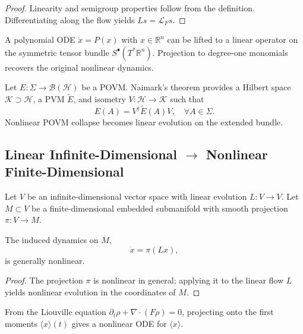 \begin{proof}
Linearity and semigroup properties follow from the definition. Differentiating
    along the flow yields $L s = \mathcal{L}_F s$.
\end{proof}

\begin{example}
A polynomial ODE $\dot{x} = P(x)$ with $x \in \mathbb{R}^n$ can be lifted to a
    linear operator on the symmetric tensor bundle
    $S^\bullet(T^*\mathbb{R}^n)$. Projection to degree-one monomials recovers
    the original nonlinear dynamics.
\end{example}

\begin{example}
Let $E: \Sigma \to \mathcal{B}(\mathcal{H})$ be a POVM. Naimark's theorem
    provides a Hilbert space $\mathcal{K} \supset \mathcal{H}$, a PVM
    $\tilde{E}$, and isometry $V: \mathcal{H} \to \mathcal{K}$ such that
\[
E(A) = V^\dagger \tilde{E}(A) V, \quad \forall A \in \Sigma.
\]
Nonlinear POVM collapse becomes linear evolution on the extended bundle.
\end{example}

\subsection{Linear Infinite-Dimensional $\to$ Nonlinear Finite-Dimensional}

Let $V$ be an infinite-dimensional vector space with linear evolution $L: V \to
V$. Let $M \subset V$ be a finite-dimensional embedded submanifold with smooth
projection $\pi: V \to M$.

\begin{theorem}
The induced dynamics on $M$,
\[
\dot{x} = \pi(L x),
\]
is generally nonlinear.
\end{theorem}

\begin{proof}
The projection $\pi$ is nonlinear in general; applying it to the linear flow
    $L$ yields nonlinear evolution in the coordinates of $M$.
\end{proof}

\begin{example}
From the Liouville equation $\partial_t \rho + \nabla \cdot (F \rho) = 0$,
    projecting onto the first moments $\langle x \rangle(t)$ gives a nonlinear
    ODE for $\langle x \rangle$.
\end{example}

